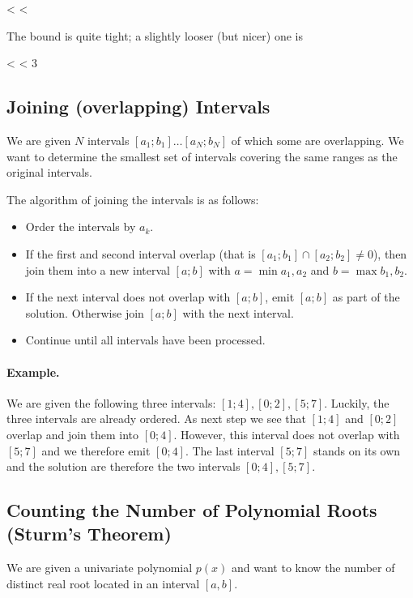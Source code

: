 \bee
{} < \pi < 
\eee

The bound is quite tight; a slightly looser (but nicer) one is

  < \pi < 3 
\eee

\subsection{Joining (overlapping) Intervals}

We are given $N$ intervals $[a_1; b_1] \ldots [a_N; b_N]$ of which some are overlapping. We want to determine the smallest set of intervals covering the same ranges as the original intervals.

The algorithm of joining the intervals is as follows:

\begin{itemize}
  \item Order the intervals by $a_k$.
  \item If the first and second interval overlap (that is $[a_1; b_1] \cap [a_2; b_2] \neq 0$), then join them into a new interval $[a;b]$ with $a = \min a_1, a_2$ and $b = \max b_1, b_2$.
  \item If the next interval does not overlap with $[a;b]$, emit $[a;b]$ as part of the solution. Otherwise join $[a;b]$ with the next interval.
  \item Continue until all intervals have been processed.
\end{itemize}


\paragraph{Example.} We are given the following three intervals: $[1;4], [0;2], [5;7]$. Luckily, the three intervals are already ordered. As next step we see that $[1;4]$ and $[0;2]$ overlap and join them into $[0;4]$. However, this interval does not overlap with $[5;7]$ and we therefore emit $[0;4]$. The last interval $[5;7]$ stands on its own and the solution are therefore the two intervals $[0;4], [5;7]$.


\subsection{Counting the Number of Polynomial Roots (Sturm's Theorem)}

We are given a univariate polynomial $p(x)$ and want to know the number of distinct real root located in an interval $[a,b]$.

